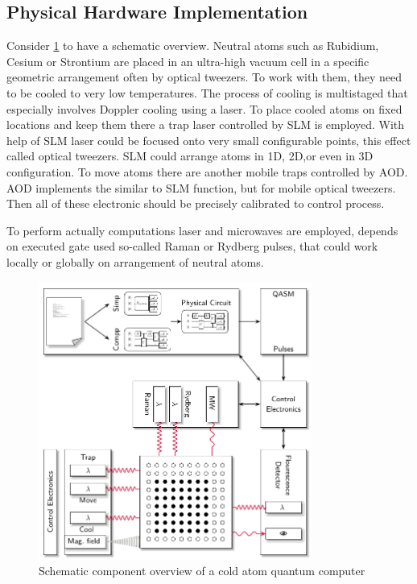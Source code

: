 \subsection{Physical Hardware Implementation}
Consider \ref{fig:ColdAtomArchitecture} to have a schematic overview.
Neutral atoms such as Rubidium, Cesium or Strontium are placed in an ultra-high vacuum cell 
in a specific geometric arrangement often by optical tweezers. 
To work with them, they need to be cooled to very low temperatures.
The process of cooling is multistaged that especially involves Doppler cooling using a laser.
To place cooled atoms on fixed locations and keep them there a trap laser controlled by \ac{SLM} is employed.
With help of \ac{SLM} laser could be focused onto very small configurable points, this effect called optical tweezers.
\ac{SLM} could arrange atoms in 1D, 2D,or even in 3D configuration.
To move atoms there are another mobile traps controlled by \ac{AOD}.
\ac{AOD} implements the similar to \ac{SLM} function, but for mobile optical tweezers.
Then all of these electronic should be precisely calibrated to control process.

To perform actually computations laser and microwaves are employed, 
depends on executed gate used so-called Raman or Rydberg pulses, 
that could work locally or globally on arrangement of neutral atoms. 
\parencite{Schmid_2024_NeutralAtomBasics, Wintersperger_2023}
\begin{figure}[htbp]
  \centering
    \includegraphics[width=0.8\textwidth]{figures/ColdAtomArchitecture.pdf}
    \caption{Schematic component overview of a cold atom quantum computer \parencite{Wintersperger_2023}}
    \label{fig:ColdAtomArchitecture}
\end{figure}

